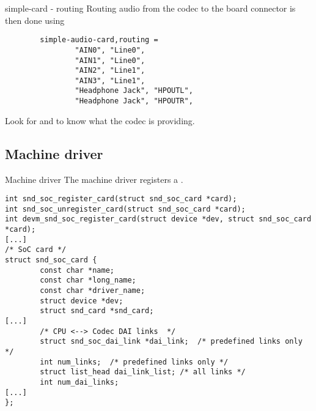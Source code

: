 \begin{frame}[fragile]{simple-card - routing}
  Routing audio from the codec to the board connector is then done
  using 
  \begin{block}{}
    \fontsize{7}{6}\selectfont
    \begin{verbatim}
        simple-audio-card,routing =
                "AIN0", "Line0",
                "AIN1", "Line0",
                "AIN2", "Line1",
                "AIN3", "Line1",
                "Headphone Jack", "HPOUTL",
                "Headphone Jack", "HPOUTR",
    \end{verbatim}
  \end{block}
  Look for  and  to
  know what the codec is providing.
\end{frame}

\subsection{Machine driver}

\begin{frame}[fragile]{Machine driver}
The machine driver registers a .
      \begin{block}{}
        \fontsize{8}{8}\selectfont
        \begin{verbatim}
int snd_soc_register_card(struct snd_soc_card *card);
int snd_soc_unregister_card(struct snd_soc_card *card);
int devm_snd_soc_register_card(struct device *dev, struct snd_soc_card *card);
[...]
/* SoC card */
struct snd_soc_card {
        const char *name;
        const char *long_name;
        const char *driver_name;
        struct device *dev;
        struct snd_card *snd_card;
[...]
        /* CPU <--> Codec DAI links  */
        struct snd_soc_dai_link *dai_link;  /* predefined links only */
        int num_links;  /* predefined links only */
        struct list_head dai_link_list; /* all links */
        int num_dai_links;
[...]
};
        \end{verbatim}
      \end{block}
\end{frame}

